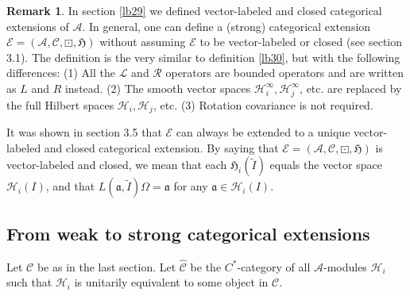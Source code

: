 \documentclass[11pt,b5paper,notitlepage]{article}
\theoremstyle{definition}
\newtheorem{rem}[df]{Remark}
\theoremstyle{plain}
\newcommand{\fk}{\mathfrak}
\newcommand{\mc}{\mathcal}
\newcommand{\wtd}{\widetilde}
\newcommand{\wht}{\widehat}
\newcommand{\scr}{\mathscr}
\numberwithin{equation}{subsection}
\begin{document}
\begin{rem}
In section \ref{lb29} we defined vector-labeled and closed categorical extensions of $\mc A$. In general, one can define a (strong) categorical extension $\scr E=(\mc A,\scr C,\boxdot,\fk H)$  without assuming $\scr E$ to be vector-labeled or closed (see \cite{Gui21a} section 3.1). The definition is the very similar to definition \ref{lb30}, but with the following differences: (1) All the $\mc L$ and $\mc R$ operators are bounded operators and are written as $L$ and $R$ instead. (2) The smooth vector spaces $\mc H_i^\infty,\mc H_j^\infty$, etc. are replaced by the full Hilbert spaces $\mc H_i,\mc H_j$, etc. (3) Rotation covariance is not required. 

It was shown in \cite{Gui21a} section 3.5 that $\scr E$ can always be extended to a unique vector-labeled and closed categorical extension. By saying that $\scr E=(\mc A,\scr C,\boxdot,\fk H)$ is vector-labeled and closed, we mean that each $\fk H_i(\wtd I)$ equals the vector space $\mc H_i(I)$, and  that $L(\fk a,\wtd I)\Omega=\fk a$ for any $\fk a\in\mc H_i(I)$. 
\end{rem}


\subsection{From weak to strong categorical extensions}\label{lb70}

Let $\scr C$ be as in the last section.  Let $\wht {\scr C}$ be the $C^*$-category of all $\mc A$-modules $\mc H_i$ such that $\mc H_i$ is  unitarily equivalent to some object in $\scr C$. 
\end{document}
